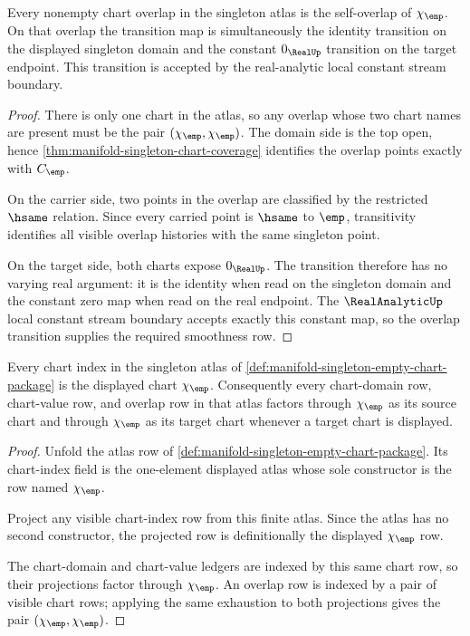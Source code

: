 \begin{theorem}
\label{thm:manifold-singleton-transition-smoothness}
Every nonempty chart overlap in the singleton atlas is the self-overlap of
$\chi_{\emp}$. On that overlap the transition map is simultaneously the
identity transition on the displayed singleton domain and the constant
$0_{\RealUp}$ transition on the target endpoint. This transition is accepted by
the real-analytic local constant stream boundary.
\end{theorem}
\begin{proof}
There is only one chart in the atlas, so any overlap whose two chart names are
present must be the pair $(\chi_{\emp},\chi_{\emp})$. The domain side is the
top open, hence \autoref{thm:manifold-singleton-chart-coverage} identifies the
overlap points exactly with $C_{\emp}$.

On the carrier side, two points in the overlap are classified by the restricted
$\hsame$ relation. Since every carried point is $\hsame$ to $\emp$, transitivity
identifies all visible overlap histories with the same singleton point.

On the target side, both charts expose $0_{\RealUp}$. The transition therefore
has no varying real argument: it is the identity when read on the singleton
domain and the constant zero map when read on the real endpoint. The
$\RealAnalyticUp$ local constant stream boundary accepts exactly this constant
map, so the overlap transition supplies the required smoothness row.
\end{proof}

\begin{theorem}
\label{thm:manifold-singleton-chart-index-exhaustion}
Every chart index in the singleton atlas of
\autoref{def:manifold-singleton-empty-chart-package} is the displayed chart
$\chi_{\emp}$. Consequently every chart-domain row, chart-value row, and
overlap row in that atlas factors through $\chi_{\emp}$ as its source chart and
through $\chi_{\emp}$ as its target chart whenever a target chart is displayed.
\end{theorem}
\begin{proof}
Unfold the atlas row of
\autoref{def:manifold-singleton-empty-chart-package}. Its chart-index field is
the one-element displayed atlas whose sole constructor is the row named
$\chi_{\emp}$.

Project any visible chart-index row from this finite atlas. Since the atlas has
no second constructor, the projected row is definitionally the displayed
$\chi_{\emp}$ row.

The chart-domain and chart-value ledgers are indexed by this same chart row, so
their projections factor through $\chi_{\emp}$. An overlap row is indexed by a
pair of visible chart rows; applying the same exhaustion to both projections
gives the pair $(\chi_{\emp},\chi_{\emp})$.
\end{proof}


